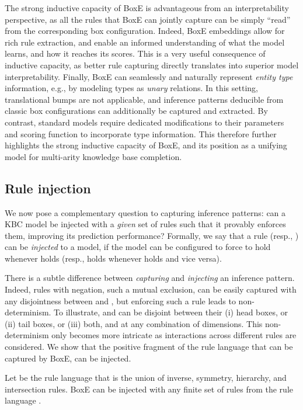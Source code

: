 \documentclass{article}
\begin{document}
The strong inductive capacity of BoxE is advantageous from an interpretability perspective, as all the rules that BoxE can jointly capture can be simply ``read'' from the corresponding box configuration. Indeed, BoxE embeddings allow for rich rule extraction, and enable an informed understanding of what the model learns, and how it reaches its scores. This is a very useful consequence of inductive capacity, as better rule capturing directly translates into superior model interpretability. Finally, BoxE can seamlessly and naturally represent \emph{entity type} information, e.g.,  by modeling types as \emph{unary} relations. In this setting, translational bumps are not applicable, and inference patterns deducible from classic box configurations can additionally be captured and extracted. By contrast, standard models require dedicated modifications to their parameters and scoring function \cite{XieLS16,ChangYYM14,LvHLL18} to incorporate type information. This therefore further highlights the strong inductive capacity of BoxE, and its position as a unifying model for multi-arity knowledge base completion. 



\subsection{Rule injection}
We now pose a complementary question to capturing inference patterns: can a KBC model be injected with a \emph{given} set of rules such that it provably enforces them, improving its prediction performance? 
Formally, we say that a rule  (resp., ) can be \emph{injected} to a model, if the model can be configured to force  to hold whenever  holds (resp.,  holds whenever  holds and vice versa). 

There is a subtle difference between \emph{capturing}  and \emph{injecting} an inference pattern. Indeed, rules with negation, such a mutual exclusion, can be easily captured with any disjointness between  and , but enforcing such a rule leads to non-determinism. 
To illustrate,  and  can be disjoint between their (i) head boxes, or (ii) tail boxes, or (iii) both, and at any combination of dimensions. This non-determinism only becomes more intricate as interactions across different rules are considered. We show that the positive fragment of the rule language that can be captured by BoxE, can be injected. 
\begin{theorem}
\label{thm:ruleInj}
Let  be the rule language that is the union of inverse, symmetry, hierarchy, and intersection rules.
BoxE can be injected with any finite set of rules from the rule language .
\end{theorem}
\end{document}
